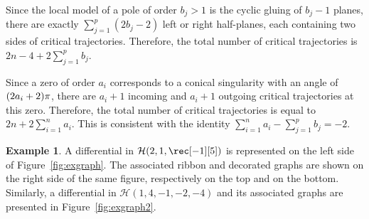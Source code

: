 \documentclass[JEP,XML,SOM,Unicode,NoFloatCountersInSection,published]{cedram}
\newcommand\calH{{\mathcal H}}
\theoremstyle{definition}
\newtheorem{ex}[thm]{Example}
\begin{document}
Since the local model of a pole of order $b_{j}>1$ is the cyclic gluing of $b_{j}-1$ planes, there are exactly $\sum_{j=1}^p (2b_{j}-2)$ left or right half-planes, each containing two sides of critical trajectories. Therefore, the total number of critical trajectories is $2n-4+ 2\sum_{j=1}^p b_{j}$.

Since a zero of order $a_{i}$ corresponds to a conical singularity with an angle of $(2a_{i}+\nobreak2)\pi$, there are $a_{i}+1$ incoming and $a_{i}+1$ outgoing critical trajectories at this zero. Therefore, the total number of critical trajectories is equal to $2n+2\sum_{i=1}^n a_{i}$. This is consistent with the identity $\sum_{i=1}^n a_{i} - \sum_{j=1}^p b_{j} = -2$.

\begin{ex}
A differential in $\calH(2,1,\rec[-1][5])$ is represented on the left side of Figure~\ref{fig:exgraph}. The associated ribbon and decorated graphs are shown on the right side of the same figure, respectively on the top and on the bottom. Similarly, a differential in $\mathcal{H}(1,4,-1,-2,-4)$ and its associated graphs are presented in Figure~\ref{fig:exgraph2}.
\begin{figure}[ht]
\centering
{}
\end{figure}
\end{ex}
\end{document}
